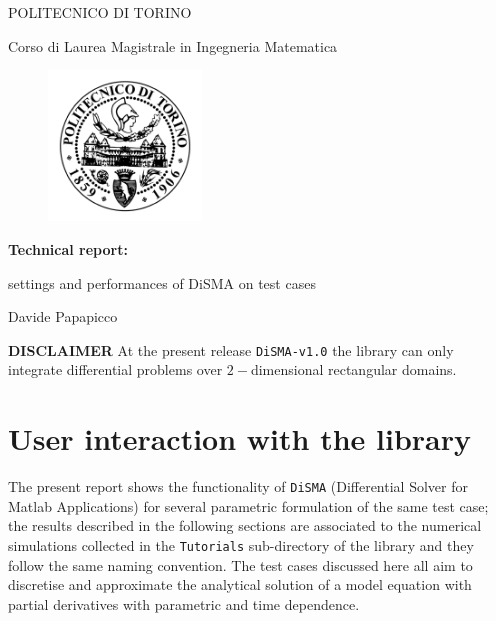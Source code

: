 \documentclass[12pt,openany,twoside,a4paper]{article}
\newcommand{\code}[1]{\colorbox{light-gray}{\texttt{#1}}}
\begin{document}
\thispagestyle{empty}
\begin{center}\textsc{\Large POLITECNICO DI TORINO}

\vspace{1cm}
\large{Corso di Laurea Magistrale in Ingegneria Matematica}

\vspace{1.5cm}
\begin{figure}[h]
  \centering
  \includegraphics[keepaspectratio,height=4cm]{logo.png}
\end{figure}
\vspace{1.5cm}
\textbf{\Large Technical report:}

\vspace{0.25cm}
\Large settings and performances of DiSMA on test cases

\vspace{7.5cm}
\large Davide Papapicco
\end{center}


\cleardoublepage

\textbf{\large{DISCLAIMER}}
\newline
\newline
At the present release \code{DiSMA-v1.0} the library can only integrate differential problems over $2-$dimensional rectangular domains.
\newpage

\section{User interaction with the library}

The present report shows the functionality of \code{DiSMA} (Differential Solver for Matlab Applications) for several parametric formulation of the same test case; the results described in the following sections are associated to the numerical simulations collected in the \code{Tutorials} sub-directory of the library and they follow the same naming convention.
\newline The test cases discussed here all aim to discretise and approximate the analytical solution of a model equation with partial derivatives with parametric and time dependence.
\end{document}
